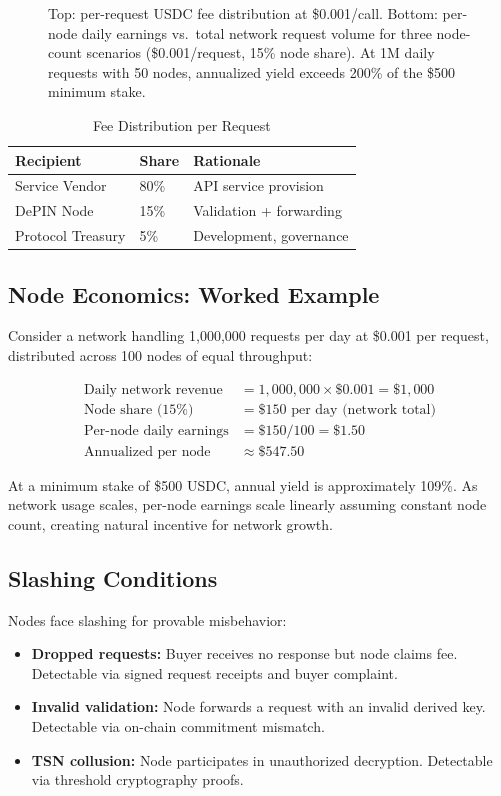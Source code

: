\documentclass[conference]{IEEEtran}
\begin{document}
\begin{figure}[!t]
\begin{tikzpicture}[font=\scriptsize, >=Stealth]
\end{tikzpicture}
\caption{Top: per-request USDC fee distribution at \$0.001/call.
Bottom: per-node daily earnings vs.\ total network request volume for three node-count
scenarios (\$0.001/request, 15\% node share). At 1M daily requests with 50 nodes,
annualized yield exceeds 200\% of the \$500 minimum stake.}
\label{fig:feedist}
\end{figure}

\begin{table}[h]
\caption{Fee Distribution per Request}
\label{tab:fees}
\renewcommand{\arraystretch}{1.2}
\begin{tabular}{lll}
\toprule
\textbf{Recipient} & \textbf{Share} & \textbf{Rationale} \\
\midrule
Service Vendor & 80\% & API service provision \\
DePIN Node & 15\% & Validation + forwarding \\
Protocol Treasury & 5\% & Development, governance \\
\bottomrule
\end{tabular}
\end{table}

\subsection{Node Economics: Worked Example}
Consider a network handling 1,000,000 requests per day at \$0.001 per request,
distributed across 100 nodes of equal throughput:

\begin{align}
\text{Daily network revenue} &= 1{,}000{,}000 \times \$0.001 = \$1{,}000 \\
\text{Node share (15\%)} &= \$150 \text{ per day (network total)} \\
\text{Per-node daily earnings} &= \$150 / 100 = \$1.50 \\
\text{Annualized per node} &\approx \$547.50
\end{align}

At a minimum stake of \$500 USDC, annual yield is approximately 109\%. As network
usage scales, per-node earnings scale linearly assuming constant node count, creating
natural incentive for network growth.

\subsection{Slashing Conditions}
Nodes face slashing for provable misbehavior:
\begin{itemize}
\item \textbf{Dropped requests:} Buyer receives no response but node claims fee.
      Detectable via signed request receipts and buyer complaint.
\item \textbf{Invalid validation:} Node forwards a request with an invalid derived key.
      Detectable via on-chain commitment mismatch.
\item \textbf{TSN collusion:} Node participates in unauthorized decryption.
      Detectable via threshold cryptography proofs.
\end{itemize}
\end{document}
